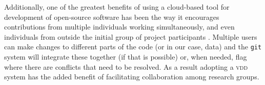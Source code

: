 \documentclass[a4paper,11pt]{article}
\begin{document}
Additionally, one of the greatest benefits of using a cloud-based tool for development of open-source software has been the way it encourages contributions from multiple individuals working simultaneously, and even individuals from outside the initial group of project participants \citep{Rogers-2013}. Multiple users can make changes to different parts of the code (or in our case, data) and the \texttt{git} system will integrate these together (if that is possible) or, when needed, flag where there are conflicts that need to be resolved. As a result adopting a \textsc{vdd} system has the added benefit of facilitating collaboration among research groups.




\end{document}
